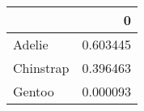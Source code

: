 \begin{tabular}{lr}
\toprule
{} &         0 \\
\midrule
Adelie    &  0.603445 \\
Chinstrap &  0.396463 \\
Gentoo    &  0.000093 \\
\bottomrule
\end{tabular}
